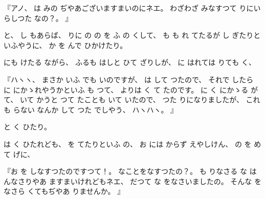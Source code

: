 %
『アノ、
%
は
みの
ぢやあございますまいのにネエ。
%
わざわざ
みなすつて
りにいらしつた
なの？。
』

%
と、
%
し
もあらば、
%
りに
の
の
を
ふ
の
くして、
%
も
も
れ
てたるが
し
ぎたりといふやうに、
%
か
を
んで
ひかけたり。

%
にも
けたる
ながら、
%
ふるも
はしと
ひて
ざりしが、
%
に
はれては
りても
く、

%
『ハヽヽ、
%
まさか
いふ
でも
いのですが、
%
は
して
つたので、
%
それで
したら
に
にかゝれやうかといふ
も
つて、
%
よりは
く
て
たのです。
%
に
く
にかゝる
が
て、
%
いて
かうと
つて
たことも
いて
いたので、
%
つた
りになりましたが、
%
これも
らない
なんか
して
つた
でしやう、
%
ハヽハヽ。%
』

%
と
く
ひたり。

%
は
く
ひたれども、
%
を
てたりといふ
の、
%
お
には
からず
えやしけん、
%
の
を
めて
げに、

%
『お
を
しなすつたのですつて！。
%
なことをなすつたの？。
%
も
りなさる
な
は
んなさりやあ
ますまいけれどもネエ、
%
だつて
な
をなさいましたの。
%
そんな
をなさら
くてもぢやあ
りませんか。
』

